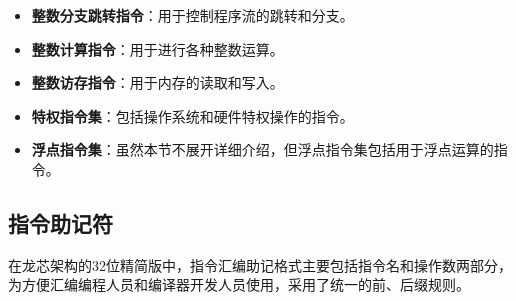 \begin{itemize}
\item \textbf{整数分支跳转指令}：用于控制程序流的跳转和分支。
\item \textbf{整数计算指令}：用于进行各种整数运算。
\item \textbf{整数访存指令}：用于内存的读取和写入。
\item \textbf{特权指令集}：包括操作系统和硬件特权操作的指令。
\item \textbf{浮点指令集}：虽然本节不展开详细介绍，但浮点指令集包括用于浮点运算的指令。
\end{itemize}


\subsection{指令助记符}\label{sec:04-toolchain-005}

在龙芯架构的32位精简版中，指令汇编助记格式主要包括指令名和操作数两部分，为方便汇编编程人员和编译器开发人员使用，采用了统一的前、后缀规则。

